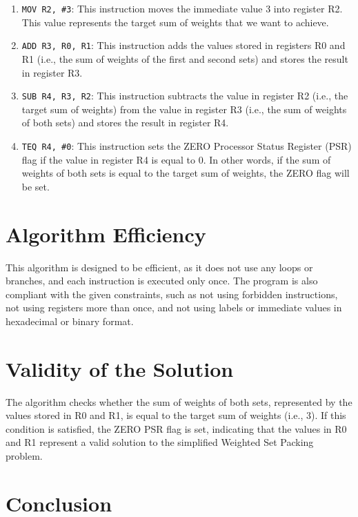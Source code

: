 \begin{enumerate}
    \item \texttt{MOV R2, \#3}: This instruction moves the immediate value 3 into register R2. This value represents the target sum of weights that we want to achieve.
    \item \texttt{ADD R3, R0, R1}: This instruction adds the values stored in registers R0 and R1 (i.e., the sum of weights of the first and second sets) and stores the result in register R3.
    \item \texttt{SUB R4, R3, R2}: This instruction subtracts the value in register R2 (i.e., the target sum of weights) from the value in register R3 (i.e., the sum of weights of both sets) and stores the result in register R4.
    \item \texttt{TEQ R4, \#0}: This instruction sets the ZERO Processor Status Register (PSR) flag if the value in register R4 is equal to 0. In other words, if the sum of weights of both sets is equal to the target sum of weights, the ZERO flag will be set.
\end{enumerate}

\section{Algorithm Efficiency}

This algorithm is designed to be efficient, as it does not use any loops or branches, and each instruction is executed only once. The program is also compliant with the given constraints, such as not using forbidden instructions, not using registers more than once, and not using labels or immediate values in hexadecimal or binary format.

\section{Validity of the Solution}

The algorithm checks whether the sum of weights of both sets, represented by the values stored in R0 and R1, is equal to the target sum of weights (i.e., 3). If this condition is satisfied, the ZERO PSR flag is set, indicating that the values in R0 and R1 represent a valid solution to the simplified Weighted Set Packing problem.

\section{Conclusion}
\label{sec:conclusion}

